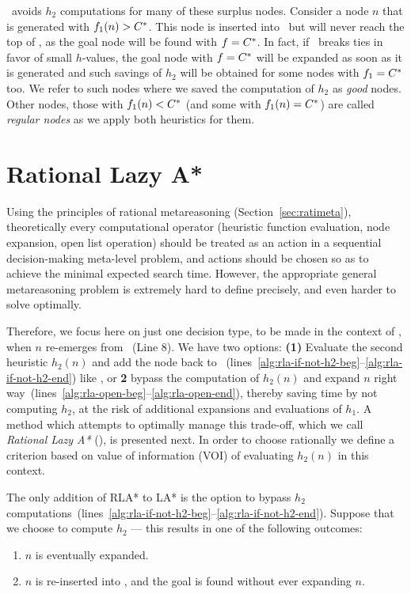 \lazyastar~avoids $h_2$ computations for many of these surplus nodes. Consider
a node $n$ that is generated with $f_1(n) > C^\ast$. This node is inserted
into \OPEN~but will never reach the top of \OPEN, as the goal node will be found
with $f=C^\ast$. In fact, if \OPEN~breaks ties in favor of small $h$-values,
the goal node with $f=C^\ast$ will be expanded as soon as it is generated and such
savings of $h_2$ will be obtained for some nodes with $f_1=C^\ast$ too. We
refer to such nodes where we saved the computation of $h_2$ as {\em good} nodes. Other nodes,
those with $f_1(n) < C^\ast$ (and some with $f_1(n) = C^\ast$) are called
{\em regular nodes} as we apply both heuristics for them.

\section{Rational Lazy A*}

Using the principles of rational metareasoning (Section~\ref{sec:ratimeta}),
theoretically every computational operator (heuristic function evaluation, node
expansion, open list operation) should be treated as an action in a sequential
decision-making meta-level problem, and actions should be chosen so as to
achieve the minimal expected search time. However, the appropriate
general metareasoning problem is extremely hard to define precisely, and even harder
to solve optimally.

Therefore, we focus here on just one decision type, to be made in the
context of \lazyastar, when $n$ re-emerges from \OPEN~(Line 8).  We
have two options: {\bf (1)} Evaluate the second heuristic $h_2(n)$ and
add the node back to \OPEN~(lines~\ref{alg:rla-if-not-h2-beg}--\ref{alg:rla-if-not-h2-end}) like \lazyastar, or {\bf 2}
bypass the computation of $h_2(n)$ and expand $n$ right way~(lines~\ref{alg:rla-open-beg}--\ref{alg:rla-open-end}), thereby saving time by not computing $h_2$, at the risk of
additional expansions and evaluations of $h_1$.  A method which
attempts to optimally manage this trade-off, which we
call \textit{Rational Lazy A*} (\rationallazyastar), is presented
next.  In order to choose rationally we define a criterion based on
value of information (VOI) of evaluating $h_2(n)$ in this context.

The only addition of RLA* to LA* is the option to bypass $h_2$ computations~(lines~\ref{alg:rla-if-not-h2-beg}--\ref{alg:rla-if-not-h2-end}).
Suppose that we choose to compute $h_2$ --- this results in one of the
following outcomes:
\begin{enumerate}
\item $n$ is eventually expanded.
\item $n$ is re-inserted into \OPEN, and the goal is found without ever expanding $n$.
\end{enumerate}


